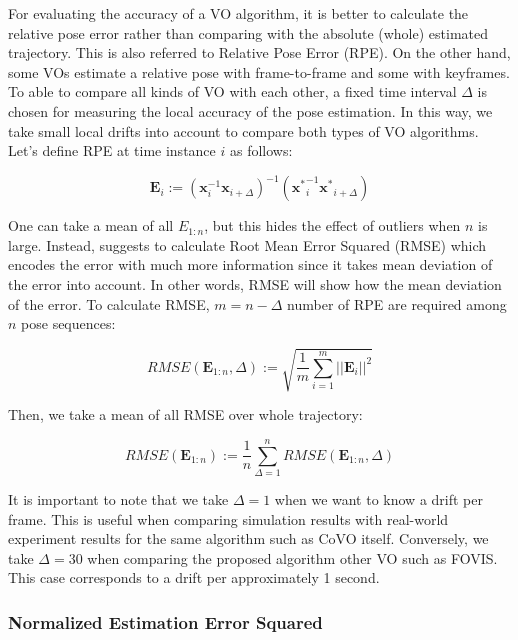 \documentclass[a4paper]{report}
\numberwithin{figure}{section}
\begin{document}
For evaluating the accuracy of a VO algorithm, it is better to calculate the 
relative pose error rather than comparing with the absolute (whole) estimated 
trajectory. This is also referred to Relative Pose Error (RPE).  On the other 
hand, some VOs estimate a relative pose with frame-to-frame and some with 
keyframes.  To able to compare all kinds of VO with each other, a fixed time 
interval $\Delta$ is chosen for measuring the local accuracy of the pose 
estimation.  In this way, we take small local drifts into account to compare 
both types of VO algorithms.  Let's define RPE at time instance $i$ as follows:

\begin{equation}
  \mathbf{E}_i := 
  (\mathbf{x}_i^{-1} \mathbf{x}_{i+\Delta})^{-1} 
  (\mathbf{x^*}_i^{-1}\mathbf{x^*}_{i+\Delta})
\end{equation}

One can take a mean of all $E_{1:n}$, but this hides the effect of outliers 
when $n$ is large.  Instead, \parencite{Sturm2012a} suggests to calculate Root 
Mean Error 
Squared (RMSE) which encodes the error with much more information since it 
takes mean deviation of the error into account.
In other words, RMSE will show how the mean deviation of the error.  To calculate RMSE, $m = n - \Delta$ number of RPE are required among $n$ pose sequences:

\begin{equation}
  RMSE(\mathbf{E}_{1:n},\Delta) := \sqrt{\frac{1}{m} \sum_{i=1}^{m}||\mathbf{E}_i||^2}
\end{equation}

Then, we take a mean of all RMSE over whole trajectory:

\begin{equation}
  RMSE(\mathbf{E}_{1:n}) :=  \frac{1}{n} \sum_{\Delta=1}^{n}RMSE(\mathbf{E}_{1:n},\Delta)
\end{equation}

It is important to note that we take $\Delta=1$ when we want to know 
a drift per frame. This is useful when comparing simulation results with 
real-world experiment results for the same algorithm such as CoVO itself. 
Conversely, we take $\Delta=30$ when comparing 
the proposed algorithm other VO such as FOVIS. This case corresponds to a drift per approximately 
1 second.

\subsubsection{Normalized Estimation Error Squared}
\end{document}
